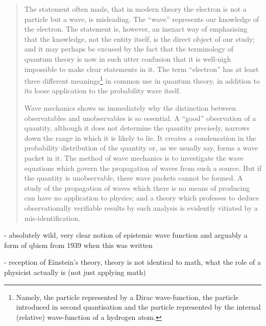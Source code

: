 \begin{quote}
    The statement often made, that in modern theory the electron is not a particle but a wave, is misleading.  The ``wave'' represents our knowledge of the electron.  The statement is, however, an inexact way of emphasising that the knowledge, not the entity itself, is the direct object of our study; and it may perhaps be excused by the fact that the terminology of quantum theory is now in such utter confusion that it is well-nigh impossible to make clear statements in it.  The term ``electron'' has at least three different meanings\footnote{Namely, the particle represented by a Dirac wave-function, the particle introduced in second quantisation and the particle represented by the internal (relative) wave-function of a hydrogen atom.} in common use in quantum theory, in addition to its loose application to the probability wave itself.
    
    Wave mechanics shows us immediately why the distinction between observatables and unobservables is so essential.  A ``good'' observation of a quantity, although it does not determine the quantity precisely, narrows down the range in which it is likely to lie.  It creates a condensation in the probability distribution of the quantity or, as we usually say, forms a wave packet in it.  The method of wave mechanics is to investigate the wave equations which govern the propagation of waves from such a source.  But if the quantity is unobservable, these wave packets cannot be formed.  A study of the propagation of waves which there is no means of producing can have no application to physics; and a theory which professes to deduce observationally verifiable results by such analysis is evidently vitiated by a mis-identification.
    
    \citep[p. 50-52]{Eddington1939}
\end{quote}

- absolutely wild, very clear notion of epistemic wave function and arguably a form of qbism from 1939 when this was written

- reception of Einstein's theory, theory is not identical to math, what the role of a physicist actually is (not just applying math)

